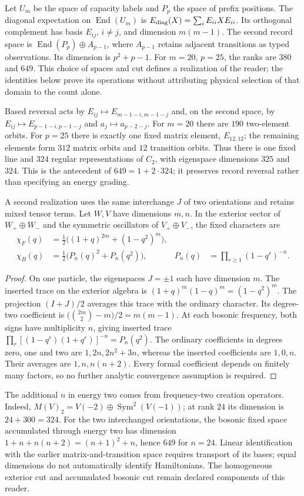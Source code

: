 Let $U_m$ be the space of capacity labels and $P_p$ the space of prefix
positions. The diagonal expectation on $\operatorname{End}(U_m)$ is
$E_{\rm diag}(X)=\sum_iE_{ii}XE_{ii}$. Its orthogonal complement has
basis $E_{ij}$, $i\ne j$, and dimension $m(m-1)$. The second record
space is $\operatorname{End}(P_p)\oplus A_{p-1}$, where $A_{p-1}$
retains adjacent transitions as typed observations. Its dimension is
$p^2+p-1$. For $m=20$, $p=25$, the ranks are $380$ and $649$.
This choice of spaces and cut defines a realization of the reader;
the identities below prove its operations without attributing physical
selection of that domain to the count alone.

Based reversal acts by $E_{ij}\mapsto E_{m-1-i,m-1-j}$ and, on the
second space, by $E_{ij}\mapsto E_{p-1-i,p-1-j}$ and
$a_j\mapsto a_{p-2-j}$. For $m=20$ there are $190$ two-element
orbits. For $p=25$ there is exactly one fixed matrix element,
$E_{12,12}$; the remaining elements form $312$ matrix orbits and
$12$ transition orbits. Thus there is one fixed line and $324$
regular representations of $C_2$, with eigenspace dimensions $325$
and $324$. This is the antecedent of $649=1+2\cdot324$; it preserves
record reversal rather than specifying an energy grading.

A second realization uses the same interchange $J$ of two orientations
and retains mixed tensor terms. Let $W,V$ have dimensions $m,n$.
In the exterior sector of $W_+\oplus W_-$ and the symmetric oscillators
of $V_+\oplus V_-$, the fixed characters are
\begin{align}
 \chi_F(q)&=\tfrac12\bigl((1+q)^{2m}+(1-q^2)^m\bigr),\\
 \chi_B(q)&=\tfrac12\bigl(P_n(q)^2+P_n(q^2)\bigr),
 &P_n(q)&=\prod_{r\geq1}(1-q^r)^{-n}.
 \label{eq:ii-ter27-caracteres}
\end{align}
\begin{proof}
On one particle, the eigenspaces $J=\pm1$ each have dimension $m$.
The inserted trace on the exterior algebra is
$(1+q)^m(1-q)^m=(1-q^2)^m$. The projection $(I+J)/2$ averages this
trace with the ordinary character. Its degree-two coefficient is
$\bigl(\binom{2m}{2}-m\bigr)/2=m(m-1)$.
At each bosonic frequency, both signs have multiplicity $n$, giving
inserted trace $\prod_r[(1-q^r)(1+q^r)]^{-n}=P_n(q^2)$.
The ordinary coefficients in degrees zero, one and two are
$1,2n,2n^2+3n$, whereas the inserted coefficients are $1,0,n$.
Their averages are $1,n,n(n+2)$. Every formal coefficient depends
on finitely many factors, so no further analytic convergence
assumption is required.
\end{proof}
The additional $n$ in energy two comes from frequency-two creation
operators. Indeed,
$M(V)_2=V(-2)\oplus\operatorname{Sym}^2(V(-1))$; at rank $24$ its
dimension is $24+300=324$. For the two interchanged orientations,
the bosonic fixed space accumulated through energy two has dimension
$1+n+n(n+2)=(n+1)^2+n$, hence $649$ for $n=24$.
Linear identification with the earlier matrix-and-transition space
requires transport of its bases; equal dimensions do not automatically
identify Hamiltonians. The homogeneous exterior cut and accumulated
bosonic cut remain declared components of this reader.

